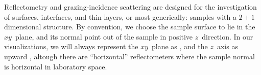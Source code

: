 Reflectometry and grazing-incidence scattering
are designed for the investigation of surfaces, interfaces, and thin layers,
or most generically:
samples with a $2+1$ dimensional structure.
By convention,
we choose the sample surface to lie in the $xy$~plane,
%
and its normal point out of the sample in positive $z$~direction.
%
%
%
%
%
%
%
%
In our visualizations, we will always represent the $xy$~plane as ,
and the $z$~axis as upward ,
altough there are ``horizontal'' reflectometers
where the sample normal is horizontal in laboratory space.
%

